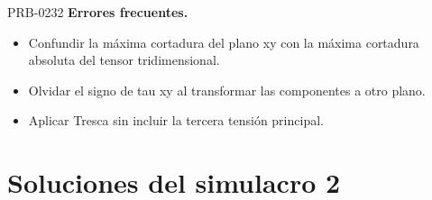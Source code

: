 \begin{studiumworked}{PRB-0232}
\textbf{Errores frecuentes.}\begin{itemize}\item Confundir la máxima cortadura del plano xy con la máxima cortadura absoluta del tensor tridimensional.
\item Olvidar el signo de tau xy al transformar las componentes a otro plano.
\item Aplicar Tresca sin incluir la tercera tensión principal.\end{itemize}

\end{studiumworked}

\chapter{Soluciones del simulacro 2}


\Needspace{.3\textheight}


